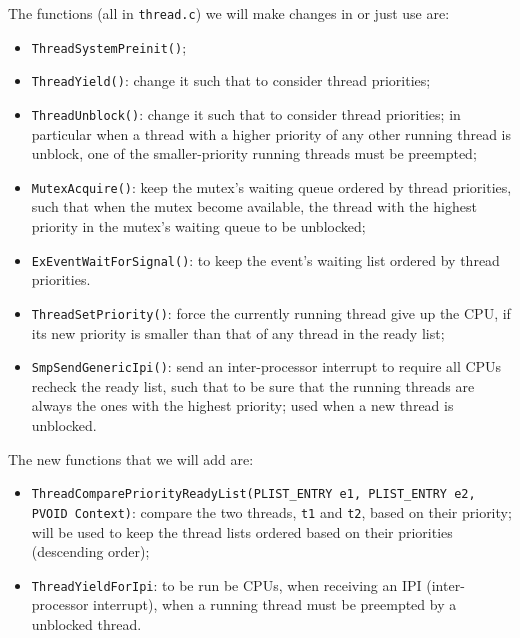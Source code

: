 The functions (all in \lstinline|thread.c|) we will make changes in or just use are:
\begin{itemize}
    \item \lstinline|ThreadSystemPreinit()|;
    
    \item \lstinline|ThreadYield()|: change it such that to consider thread priorities;
    
    \item \lstinline|ThreadUnblock()|: change it such that to consider thread priorities; in particular when a thread with a higher priority of any other running thread is unblock, one of the smaller-priority running threads must be preempted;

    \item \lstinline|MutexAcquire()|: keep the mutex's waiting queue ordered by thread priorities, such that when the mutex become available, the thread with the highest priority in the mutex's waiting queue to be unblocked;
    
    \item \lstinline|ExEventWaitForSignal()|: to keep the event's waiting list ordered by thread priorities.
    
    \item \lstinline|ThreadSetPriority()|: force the currently running thread give up the CPU, if its new priority is smaller than that of any thread in the ready list;
    
    \item \lstinline|SmpSendGenericIpi()|: send an inter-processor interrupt to require all CPUs recheck the ready list, such that to be sure that the running threads are always the ones with the highest priority; used when a new thread is unblocked.
\end{itemize}

The new functions that we will add are:
\begin{itemize}
    \item \lstinline|ThreadComparePriorityReadyList(PLIST_ENTRY e1, PLIST_ENTRY e2, PVOID Context)|: compare the two threads, \texttt{t1} and \texttt{t2}, based on their priority; will be used to keep the thread lists ordered based on their priorities (descending order);
    
    \item \lstinline|ThreadYieldForIpi|: to be run be CPUs, when receiving an IPI (inter-processor interrupt), when a running thread must be preempted by a unblocked thread.
\end{itemize}



